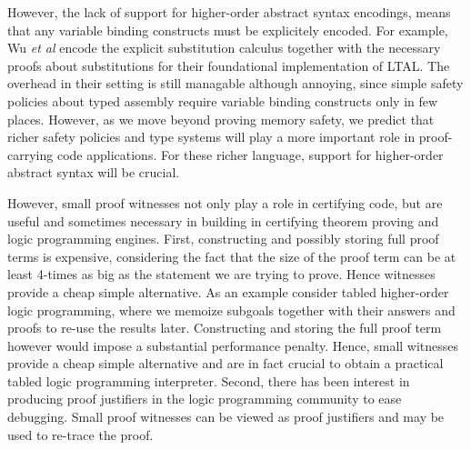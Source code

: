 \documentclass{acmconf}
\begin{document}

However, the lack of support for higher-order abstract syntax
encodings, means that any variable binding constructs must be
explicitely encoded. For example, Wu {\em et al}\cite{Appel:PPDP03}
encode the explicit substitution calculus \cite{Abadi:POPL90} together
with the necessary proofs about substitutions for their foundational
implementation of LTAL. The overhead in their setting is still
managable although annoying, since simple safety policies about
typed assembly require variable binding constructs only in few
places. However, as we move beyond proving memory safety, we predict
that richer safety policies and type systems will play a more
important role in proof-carrying code applications. For these richer
language, support for higher-order abstract syntax will be
crucial. 

However, small proof
witnesses not only play a role in certifying code, but are useful and
sometimes necessary in building in certifying theorem proving and
logic programming engines. First, constructing and possibly storing
full proof terms is expensive, considering the fact that the size of
the proof term can be at least 4-times as big as the statement we are
trying to prove. Hence witnesses provide a cheap
simple alternative. As an example consider tabled higher-order logic
programming, where we memoize subgoals together with their answers and
proofs to re-use the results later. Constructing and storing the full
proof term however would impose a substantial performance
penalty. Hence, small witnesses provide a cheap
simple alternative and are in fact crucial to obtain a practical
tabled logic programming interpreter. Second, there has been interest
in producing proof justifiers in the logic programming community to
ease debugging. Small proof witnesses can be viewed as proof
justifiers and may be used to re-trace the proof. 
\end{document}
